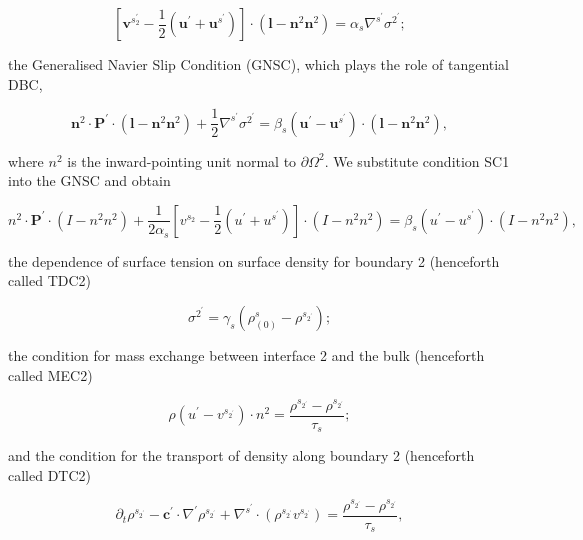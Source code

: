 \documentclass{article}
\begin{document}
\begin{equation}
\left[\pmb{v}^{s_{2}^{\prime}} - \frac{1}{2} (\pmb{u}^{\prime} + \pmb{u}^{s^{\prime}})\right]\cdot (\pmb {l} - \pmb{n}^{2}\pmb{n}^{2}) = \alpha_{s}\nabla^{s^{\prime}}\sigma^{2^{\prime}}; \tag{2.21}
\end{equation}

the Generalised Navier Slip Condition (GNSC), which plays the role of tangential DBC,

\begin{equation}
\pmb{n}^{2}\cdot \pmb{P}^{\prime}\cdot (\pmb {l} - \pmb{n}^{2}\pmb{n}^{2}) + \frac{1}{2}\nabla^{s^{\prime}}\sigma^{2^{\prime}} = \beta_{s}(\pmb{u}^{\prime} - \pmb{u}^{s^{\prime}})\cdot (\pmb {l} - \pmb{n}^{2}\pmb{n}^{2}), \tag{2.22}
\end{equation}

where \(n^2\) is the inward-pointing unit normal to \(\partial \Omega^2\). We substitute condition SC1 into the GNSC and obtain

\begin{equation}
n^2\cdot \pmb {P}^{\prime}\cdot (I - n^2 n^2) + \frac{1}{2\alpha_s}\left[v^{s_2} - \frac{1}{2} (u^{\prime} + u^{s^{\prime}})\right]\cdot (I - n^2 n^2) = \beta_s(u^{\prime} - u^{s^{\prime}})\cdot (I - n^2 n^2), \tag{2.23}
\end{equation}

the dependence of surface tension on surface density for boundary 2 (henceforth called TDC2)

\begin{equation}
\sigma^{2^{\prime}} = \gamma_{s}\left(\rho_{(0)}^{s} - \rho^{s_{2^{\prime}}}\right); \tag{2.24}
\end{equation}

the condition for mass exchange between interface 2 and the bulk (henceforth called MEC2)

\begin{equation}
\rho (u^{\prime} - v^{s_{2^{\prime}}})\cdot n^{2} = \frac{\rho^{s_{2^{\prime}}} - \rho^{s_{2^{\prime}}}}{\tau_{s}}; \tag{2.25}
\end{equation}

and the condition for the transport of density along boundary 2 (henceforth called DTC2)

\begin{equation}
\partial_{t}\rho^{s_{2^{\prime}}} - \pmb{c}^{\prime}\cdot \nabla^{\prime}\rho^{s_{2^{\prime}}} + \nabla^{s^{\prime}}\cdot (\rho^{s_{2^{\prime}}}v^{s_{2^{\prime}}}) = \frac{\rho^{s_{2^{\prime}}} - \rho^{s_{2^{\prime}}}}{\tau_{s}}, \tag{2.26}
\end{equation}
\end{document}
